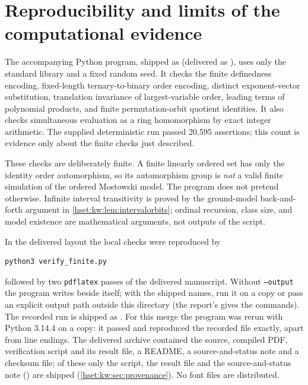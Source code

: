 \documentclass[11pt,letterpaper]{article}
\theoremstyle{definition}
\theoremstyle{remark}
\begin{document}
\section{Reproducibility and limits of the computational evidence}
\label{hset:kw:sec:reproduce}

The accompanying Python program, shipped as  (delivered as ), uses only the standard library and a fixed random seed. It checks the finite definedness encoding, fixed-length ternary-to-binary order encoding, distinct exponent-vector substitution, translation invariance of largest-variable order, leading terms of polynomial products, and finite permutation-orbit quotient identities. It also checks simultaneous evaluation as a ring homomorphism by exact integer arithmetic. The supplied deterministic run passed 20,595 assertions; this count is evidence only about the finite checks just described.

These checks are deliberately finite. A finite linearly ordered set has only the identity order automorphism, so its automorphism group is \emph{not} a valid finite simulation of the ordered Mostowski model. The program does not pretend otherwise. Infinite interval transitivity is proved by the ground-model back-and-forth argument in \cref{hset:kw:lem:intervalorbits}; ordinal recursion, class size, and model existence are mathematical arguments, not outputs of the script.

In the delivered layout the local checks were reproduced by
\begin{verbatim}
python3 verify_finite.py
\end{verbatim}
followed by two \texttt{pdflatex} passes of the delivered manuscript. Without
\texttt{--output} the program writes  beside
itself; with the shipped names, run it on a copy or pass an explicit output
path outside this directory (the report's  gives the
commands). The recorded run is shipped as
. For this merge
the program was rerun with Python 3.14.4 on a copy: it passed and reproduced the
recorded file exactly, apart from line endings. The delivered archive contained
the source, compiled PDF, verification script and its result file, a README, a
source-and-status note and a checksum file; of these only the script, the
result file and the source-and-status note
() are shipped
(\cref{hset:kw:sec:provenance}). No font files are distributed.
\end{document}
